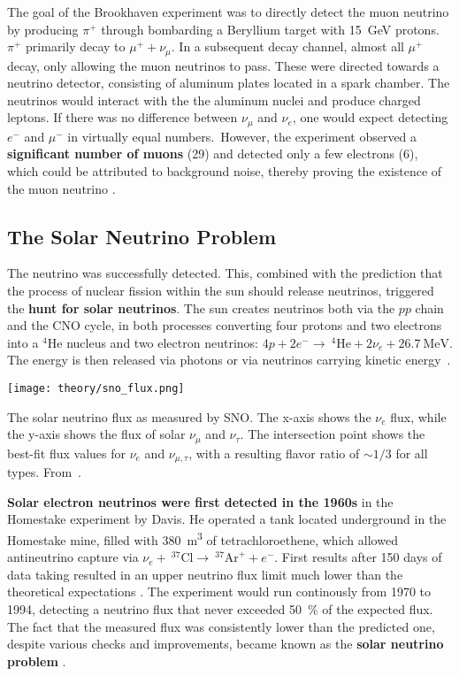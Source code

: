 The goal of the Brookhaven experiment  was to directly detect the muon neutrino by producing $\pi^+$ through bombarding a Beryllium target with \SI{15}{\giga\eV} protons. $\pi^+$ primarily decay to $\mu^+ + \nu_\mu$. In a subsequent decay channel, almost all $\mu^+$ decay, only allowing the muon neutrinos to pass. These were directed towards a neutrino detector, consisting of aluminum plates located in a spark chamber. The neutrinos would interact with the the aluminum nuclei and produce charged leptons. If there was no difference between $\nu_\mu$ and $\nu_e$, one would expect detecting $e^-$ and $\mu^-$ in virtually equal numbers.\ However, the experiment observed a \textbf{significant number of muons} (29) and detected only a few electrons (6), which could be attributed to background noise, thereby proving the existence of the muon neutrino \cite{Danby1962}.

\subsection{The Solar Neutrino Problem}

The neutrino was successfully detected. This, combined with the prediction that the process of nuclear fission within the sun should release neutrinos, triggered the \textbf{hunt for solar neutrinos}. The sun creates neutrinos both via the $pp$ chain and the CNO cycle, in both processes converting four protons and two electrons into a $^4\text{He}$ nucleus and two electron neutrinos: $4p + 2e^- \rightarrow  ~^4\text{He} + 2\nu_e + \SI{26.7}{\mega\eV}$. The energy is then released via photons or via neutrinos carrying kinetic energy~\cite{Giunti2007}.

\begin{marginfigure}
    \texttt{[image: theory/sno\_flux.png]}
    \caption[Solar neutrino flux measured by SNO]{The solar neutrino flux as measured by SNO\@. The x-axis shows the $\nu_e$ flux, while the y-axis shows the flux of solar $\nu_\mu$ and $\nu_\tau$. The intersection point shows the best-fit flux values for $\nu_e$ and $\nu_{\mu,\tau}$, with a resulting flavor ratio of $\sim1/3$ for all types. From~\cite{Ahmad2002}.}
\end{marginfigure}

\textbf{Solar electron neutrinos were first detected in the 1960s} in the Homestake experiment by Davis. He operated a tank located underground in the Homestake mine, filled with \SI{380}{\meter\cubed} of tetrachloroethene, which allowed antineutrino capture via $\nu_e +~ ^{37}\text{Cl} \rightarrow ~ ^{37}\text{Ar}^+ + e^-$. First results after 150 days of data taking resulted in an upper neutrino flux limit much lower than the theoretical expectations . The experiment would run continously from 1970 to 1994, detecting a neutrino flux that never exceeded \SI{50}{\percent} of the expected flux. The fact that the measured flux was consistently lower than the predicted one, despite various checks and improvements, became known as the \textbf{solar neutrino problem} .

